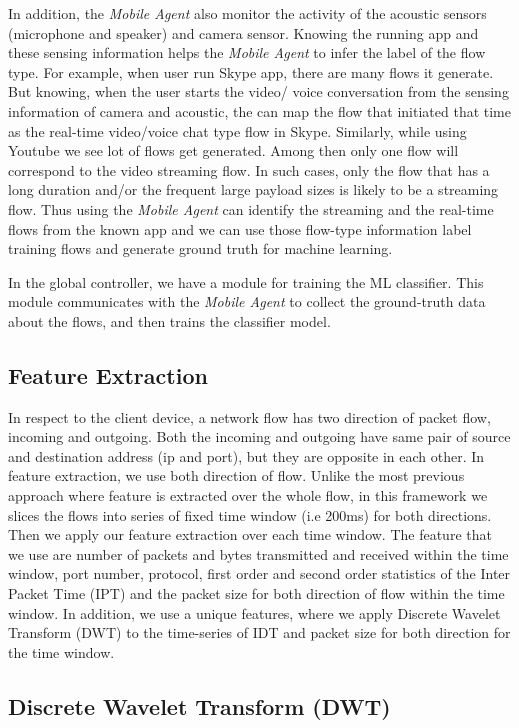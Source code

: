 \documentclass[12pt]{amsart}
\begin{document}
In addition, the \textit{Mobile Agent} also monitor the activity of the acoustic sensors (microphone and speaker) and camera sensor. Knowing the running app and these sensing information helps the \textit{Mobile Agent} to infer the label of the flow type. For example, when user run Skype app, there are many flows it generate. But knowing, when the user starts the video/ voice conversation from the sensing information of camera and acoustic, the  can map the flow that initiated that time as the real-time video/voice chat type flow in Skype. Similarly, while using Youtube we see lot of flows get generated. Among then only one flow will correspond to the video streaming flow. In such cases, only the flow that has a long duration and/or the frequent large payload sizes is likely to be a streaming flow. Thus using the \textit{Mobile Agent} can identify the streaming and the real-time flows from the known app and we can use those flow-type information label training flows and generate ground truth for machine learning. 

In the global controller, we have a module for training the ML classifier. This module communicates with the \textit{Mobile Agent} to collect the ground-truth data about the flows, and then trains the classifier model.  

\subsection{Feature Extraction}
In respect to the client device, a network flow has two direction of packet flow, incoming and outgoing. Both the incoming and outgoing have same pair of source and destination address (ip and port), but they are opposite in each other. In feature extraction, we use both direction of flow. Unlike the most previous approach where feature is extracted over the whole flow, in this framework we slices  the flows into series of fixed time window (i.e 200ms) for both directions. Then we apply our feature extraction over each time window. The feature that we use are number of packets and bytes  transmitted and received within the time window,  port number, protocol, first order and second order statistics of the Inter Packet Time (IPT) and the packet size for both direction of flow within the time window. In addition, we use a unique features, where we apply Discrete Wavelet Transform (DWT) to the time-series of IDT and packet size for both direction for the time window. 


\subsection{Discrete Wavelet Transform (DWT)}
\end{document}
